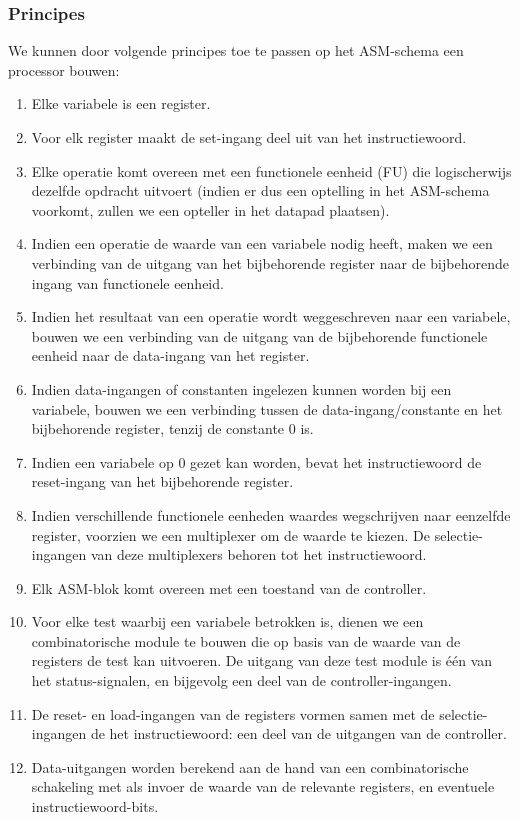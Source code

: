 \subsubsection{Principes}
We kunnen door volgende principes toe te passen op het ASM-schema een processor bouwen:
\begin{enumerate}
 \item Elke variabele is een register.
 \item Voor elk register maakt de set-ingang deel uit van het instructiewoord.
 \item Elke operatie komt overeen met een functionele eenheid (FU) die logischerwijs dezelfde opdracht uitvoert (indien er dus een optelling in het ASM-schema voorkomt, zullen we een opteller in het datapad plaatsen).
 \item Indien een operatie de waarde van een variabele nodig heeft, maken we een verbinding van de uitgang van het bijbehorende register naar de bijbehorende ingang van functionele eenheid.
 \item Indien het resultaat van een operatie wordt weggeschreven naar een variabele, bouwen we een verbinding van de uitgang van de bijbehorende functionele eenheid naar de data-ingang van het register.
 \item Indien data-ingangen of constanten ingelezen kunnen worden bij een variabele, bouwen we een verbinding tussen de data-ingang/constante en het bijbehorende register, tenzij de constante 0 is.
 \item Indien een variabele op 0 gezet kan worden, bevat het instructiewoord de reset-ingang van het bijbehorende register.
 \item Indien verschillende functionele eenheden waardes wegschrijven naar eenzelfde register, voorzien we een multiplexer om de waarde te kiezen. De selectie-ingangen van deze multiplexers behoren tot het instructiewoord.
 \item Elk ASM-blok komt overeen met een toestand van de controller.
 \item Voor elke test waarbij een variabele betrokken is, dienen we een combinatorische module te bouwen die op basis van de waarde van de registers de test kan uitvoeren. De uitgang van deze test module is \'e\'en van het status-signalen, en bijgevolg een deel van de controller-ingangen.
 \item De reset- en load-ingangen van de registers vormen samen met de selectie-ingangen de het instructiewoord: een deel van de uitgangen van de controller.
 \item Data-uitgangen worden berekend aan de hand van een combinatorische schakeling met als invoer de waarde van de relevante registers, en eventuele instructiewoord-bits.
\end{enumerate}
